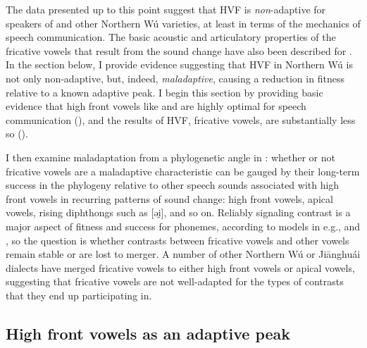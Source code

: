 \documentclass[output=paper,hidelinks]{langscibook}
\begin{document}
The data presented up to this point suggest that HVF is \textit{non}-adaptive for speakers of \SC{} and other Northern Wú varieties, at least in terms of the mechanics of speech communication.
%
The basic acoustic and articulatory properties of the fricative vowels that result from the sound change have also been described for \SC{}. In the section below, I provide evidence suggesting that HVF in Northern Wú is not only non-adaptive, but, indeed, \textit{maladaptive}, causing a reduction in fitness relative to a known adaptive peak.
%
I begin this section by providing basic evidence that high front vowels like \pri{} and \pry{} are highly optimal for speech communication (), and the results of HVF, fricative vowels, are substantially less so ().

I then examine maladaptation from a phylogenetic angle in : whether or not fricative vowels are a maladaptive characteristic can be gauged by their long-term success in the phylogeny relative to other speech sounds associated with high front vowels in recurring patterns of sound change: high front vowels, apical vowels, rising diphthongs such as [əi̯], and so on. Reliably signaling contrast is a major aspect of fitness and success for phonemes, according to models in e.g., \citet{wedel-exemplar} and \citet{wedel-high}, so the question is whether contrasts between fricative vowels and other vowels remain stable or are lost to merger. A number of other Northern Wú or Ji\={a}nghu\'{a}i  dialects have merged fricative vowels to either high front vowels or apical vowels, suggesting that fricative vowels are not well-adapted for the types of contrasts that they end up participating in.

\subsection{High front vowels as an adaptive peak}\label{sec:faytak:4.1}
\end{document}
